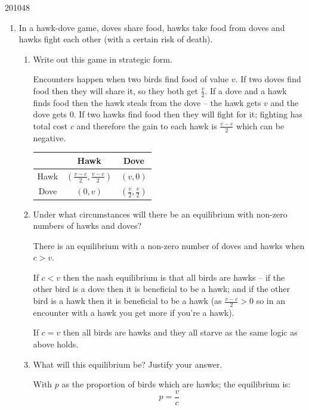 \documentclass[a4paper]{article}
\begin{document}
\begin{examquestion}{2010}{4}{8}

\begin{enumerate}[label=(\alph*)]

\item In a hawk-dove game, doves share food, hawks take food from doves and
hawks fight each other (with a certain risk of death).

\begin{enumerate}[label=(\roman*)]

\item Write out this game in strategic form.

Encounters happen when two birds find food of value $v$. If two doves find
food then they will share it, so they both get $\frac{v}{2}$. If a dove and
a hawk finds food then the hawk steals from the dove -- the hawk gets $v$
and the dove gets $0$. If two hawks find food then they will fight for it;
fighting has total cost $c$ and therefore the gain to each hawk is $\frac{v - c
}{2}$ which can be negative.

\begin{table}[H]
\centering
\begin{tabular}{c|c c}
& Hawk & Dove \\
\hline
Hawk & $\left( \frac{v - c}{2}, \frac{v - c}{2} \right)$ & $(v, 0)$ \\
Dove & $(0, v)$ & $\left( \frac{v}{2}, \frac{v}{2} \right)$
\end{tabular}
\end{table}

\item Under what circumstances will there be an equilibrium with non-zero
numbers of hawks and doves?

There is an equilibrium with a non-zero number of doves and hawks when $c >
v$.

If $c < v$ then the nash equilibrium is that all birds are hawks -- if
the other bird is a dove then it is beneficial to be a hawk; and if the
other bird is a hawk then it is beneficial to be a hawk (as
$\frac{v - c}{2} > 0$ so in an encounter with a hawk you get more if you're
a hawk).

If $c = v$ then all birds are hawks and they all starve as the same logic as
above holds.

\item What will this equilibrium be? Justify your answer.

With $p$ as the proportion of birds which are hawks; the equilibrium is:
\[
p = \frac{v}{c}
\]


\end{enumerate}
\end{enumerate}
\end{examquestion}
\end{document}
